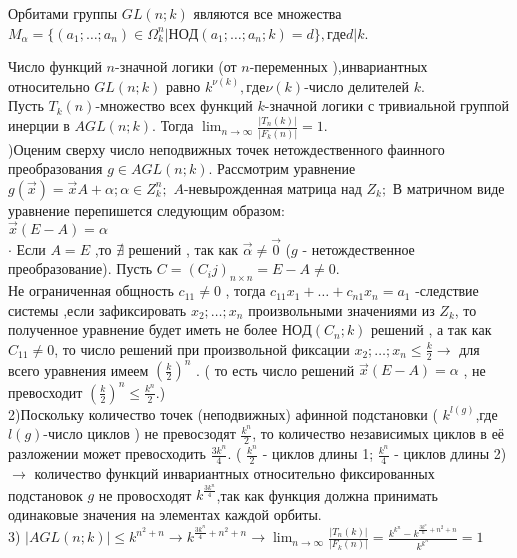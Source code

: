 \thr
Орбитами группы $GL(n;k)$ являются все множества $M_\alpha=\{(a_1;\dots;a_n)\in \Omega_k^n|НОД(a_1;\dots;a_n;k)=d\},где d|k$.
                   
\conseq
Число функций $n$-значной логики (от $n$-переменных ),инвариантных относительно $GL(n;k)$ равно $k^{\nu(k)},где \nu(k)$-число делителей $k$.\\


\thr
Пусть $T_k(n)$-множество всех функций $k$-значной логики с тривиальной группой инерции в $AGL(n;k)$. Тогда $  \lim_{n\to\infty} \frac{|T_n(k)|}{|F_k(n)|}  =1$.\\

)Оценим сверху число неподвижных точек нетождественного фаинного преобразования $g \in AGL(n;k)$.  Рассмотрим уравнение $g(\vec{x})=\vec{x}A+\alpha;\alpha \in Z_k^n;$ $A$-невырожденная матрица над $Z_k;$ В матричном виде уравнение перепишется следующим образом:\\
$\vec{x}(E-A)=\alpha $\\
$\cdot$ Если $A=E$ ,то $\nexists$ решений , так как $\vec{\alpha}\neq \vec{0}$ ($g$ - нетождественное преобразование). Пусть $ C=(C_ij)_{n \times n} = E-A \neq 0 $.\\

Не ограниченная общность $c_{11} \neq 0 $ , тогда $ c_{11} x_1 + \dots + c_{n1} x_n = a_1 $ -следствие системы ,если зафиксировать $x_2;\dots;x_n $ произвольными значениями из $Z_k $, то полученное уравнение будет иметь не более $НОД(C_n;k) $ решений , а так как $C_{11} \neq 0$, то число решений при произвольной фиксации $x_2;\dots;x_n \leqslant \frac{k}{2} \rightarrow $ для всего уравнения имеем $ (\frac {k}{2})^n$ . ( то есть число решений $\vec{x}(E-A) = \alpha $ , не превосходит $(\frac {k}{2})^n \leqslant \frac {k^n}{2} $.)\\
2)Поскольку количество точек (неподвижных) афинной подстановки ( $ k^{l(g)} $,где $l(g)$-число циклов ) не превосзодят $\frac {k^n}{2} $, то количество независимых циклов в её разложении может превосходить $\frac {3k^n}{4} $. ( $\frac {k^n}{2} $ - циклов длины 1; $\frac {k^n}{4} $ - циклов длины 2)\\
$\rightarrow $ количество функций инвариантных относительно фиксированных подстановок $g$ не провосходят $k^{\frac{3k^n}{4}}$,так как функция должна принимать одинаковые значения на элементах каждой орбиты. \\
3) $|AGL(n;k)| \leqslant k^{n^2+n} \rightarrow k^{\frac{3k^n}{4} +n^2 +n} \rightarrow \lim_{n\to\infty} \frac{|T_n(k)|}{|F_k(n)|} = \frac {k^{k^n}-k^{\frac {3k^n}{n}+n^2+n}}{k^{k^n}}=1$\\

